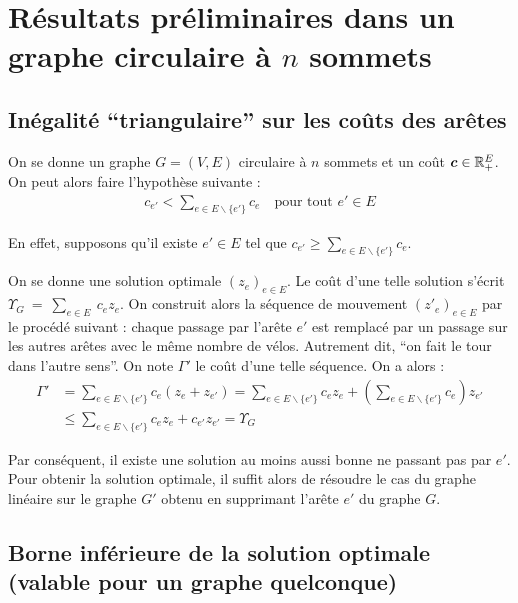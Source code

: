 \chapter{Résultats préliminaires dans un graphe circulaire à $n$ sommets}
\label{Résultats préliminaires}

\section{Inégalité ``triangulaire'' sur les coûts des arêtes}
\label{sec: Inégalité triangulaire}

On se donne un graphe $G=(V,E)$ circulaire à $n$ sommets et un coût $\boldsymbol{c} \in \mathbb{R}^E_+$. On peut alors faire l'hypothèse suivante :
\begin{gather}\label{Inégalité Triangulaire}
  c_{e'}<\sum_{e \in E \backslash \{e'\}} c_e \quad \text{pour tout } e' \in E
\end{gather}

En effet, supposons qu'il existe $e' \in E$ tel que $c_{e'} \ge \sum_{e \in E \backslash \{e'\}} c_e$.

On se donne une solution optimale $(z_e)_{e \in E}$. Le coût d'une telle solution s'écrit $\Upsilon_{G}~=~\sum_{e \in E}~c_ez_e$. On construit alors la séquence de mouvement $(z'_e)_{e \in E}$ par le procédé suivant : chaque passage par l'arête $e'$ est remplacé par un passage sur les autres arêtes avec le même nombre de vélos. Autrement dit, ``on fait le tour dans l'autre sens''. On note $\Gamma'$ le coût d'une telle séquence. On a alors :
\begin{align*}
  \Gamma' &= \sum_{e \in E \backslash \{e'\}} c_e (z_e + z_{e'}) = \sum_{e \in E \backslash \{e'\}} c_ez_e + \left(\sum_{e \in E \backslash \{e'\}} c_{e}\right)z_{e'} \\
     &\le \sum_{e \in E \backslash \{e'\}} c_ez_e + c_{e'}z_{e'} = \Upsilon_{G}
\end{align*}

Par conséquent, il existe une solution au moins aussi bonne ne passant pas par $e'$. Pour obtenir la solution optimale, il suffit alors de résoudre le cas du graphe linéaire sur le graphe $G'$ obtenu en supprimant l'arête $e'$ du graphe $G$.

\section{Borne inférieure de la solution optimale (valable pour un graphe quelconque)}
\label{Borne inf générale}

